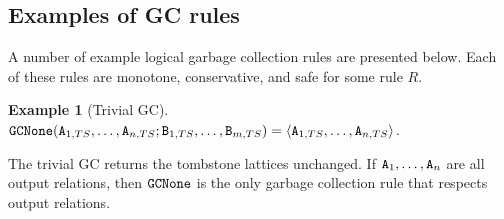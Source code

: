 \documentclass{article}
\numberwithin{equation}{section}
\newtheorem{example}{Example}[section]
\renewcommand{\tt}[1]{\ifmmode\text{\texttt{#1}}\else\texttt{#1}\fi}
\begin{document}
\subsection{Examples of GC rules}
\label{sec:logical:example}
A number of example logical garbage collection rules are presented below.
Each of these rules are monotone, conservative, and safe for some rule $R$.
\begin{example}[Trivial GC]
$\tt{GCNone}(\tt{A}_{1,TS}, \dots, \tt{A}_{n,TS}; \tt{B}_{1,TS}, \dots, \tt{B}_{m,TS}) = \langle \tt{A}_{1,TS}, \dots, \tt{A}_{n,TS} \rangle$.
\end{example}
The trivial GC returns the tombstone lattices unchanged.
If $\tt{A}_1, \dots, \tt{A}_n$ are all output relations, then $\tt{GCNone}$ is the only garbage collection rule that respects output relations.
\end{document}
